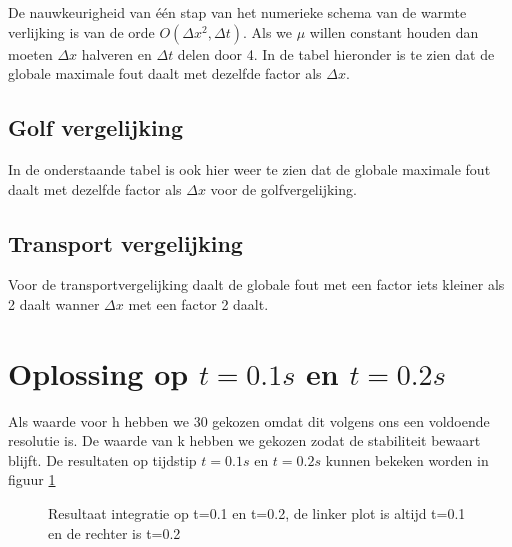 \documentclass[11pt]{article} %
\begin{document}
	De nauwkeurigheid van één stap van het numerieke schema van de warmte verlijking is van de orde $O(\Delta x^2 , \Delta t) $. Als we $\mu$ willen constant houden dan moeten $\Delta x $ halveren en $ \Delta t$ delen door 4. In de tabel hieronder is te zien dat de globale maximale fout daalt met dezelfde factor als $\Delta x$.  
	
		\begin{center}
			
		\end{center}
	
	
	\subsection{Golf vergelijking}
In de onderstaande tabel is ook hier weer te zien dat de globale maximale fout daalt met dezelfde factor als $\Delta x$ voor de golfvergelijking.  
		\begin{center}
			
		\end{center}
	\subsection{Transport vergelijking}
Voor de transportvergelijking daalt de globale fout met een factor iets kleiner als 2 daalt wanner $\Delta x$ met een factor 2 daalt. 
		\begin{center}
			
		\end{center}
	
\section{Oplossing op $t=0.1s$ en $t=0.2s$}
Als waarde voor h hebben we 30 gekozen omdat dit volgens ons een voldoende resolutie is. De waarde van k hebben we gekozen zodat de stabiliteit bewaart blijft. De resultaten op tijdstip $t=0.1s$ en $t=0.2s$ kunnen bekeken worden in figuur \ref{fig:Deel4}\
	
	\begin{figure}[H]
		\centering
		\caption{Resultaat integratie op t=0.1 en t=0.2, de linker plot is altijd t=0.1 en de rechter is t=0.2}
			\label{fig:Deel4}
	\end{figure}
\end{document}
